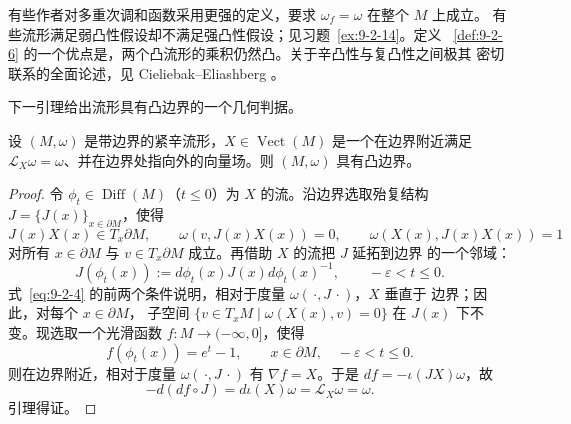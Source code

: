 \begin{remark}\label{rem:9-2-7}
有些作者对多重次调和函数采用更强的定义，要求 $\omega_f=\omega$ 在整个 $M$ 上成立。
有些流形满足弱凸性假设却不满足强凸性假设；见习题~\ref{ex:9-2-14}。定义
~\ref{def:9-2-6} 的一个优点是，两个凸流形的乘积仍然凸。关于辛凸性与复凸性之间极其
密切联系的全面论述，见 Cieliebak--Eliashberg 。
\end{remark}

下一引理给出流形具有凸边界的一个几何判据。

\begin{lemma}\label{lem:9-2-8}
设 $(M,\omega)$ 是带边界的紧辛流形，$X\in\operatorname{Vect}(M)$ 是一个在边界附近满足
$\mathcal L_X\omega=\omega$、并在边界处指向外的向量场。则 $(M,\omega)$ 具有凸边界。
\end{lemma}

\begin{proof}
令 $\phi_t\in\operatorname{Diff}(M)$（$t\le0$）为 $X$ 的流。沿边界选取殆复结构
$J=\{J(x)\}_{x\in\partial M}$，使得
\begin{equation}\label{eq:9-2-4}
  J(x)X(x)\in T_x\partial M,
  \qquad \omega(v,J(x)X(x))=0,
  \qquad \omega(X(x),J(x)X(x))=1
\end{equation}
对所有 $x\in\partial M$ 与 $v\in T_x\partial M$ 成立。再借助 $X$ 的流把 $J$ 延拓到边界
的一个邻域：
\[
  J(\phi_t(x)):=d\phi_t(x)J(x)d\phi_t(x)^{-1},
  \qquad -\varepsilon<t\le0.
\]
式~\eqref{eq:9-2-4} 的前两个条件说明，相对于度量 $\omega(\,·,J\,·)$，$X$ 垂直于
边界；因此，对每个 $x\in\partial M$，
子空间
$\{v\in T_xM\mid\omega(X(x),v)=0\}$ 在 $J(x)$ 下不变。现选取一个光滑函数
$f:M\to(-\infty,0]$，使得
\[
  f(\phi_t(x))=e^t-1,
  \qquad x\in\partial M,\quad -\varepsilon<t\le0.
\]
\sourcefootnote{原书此处印作 $f(\phi_t(x))=e^t$，但同时规定
$f:M\to(-\infty,0]$ 且 $\partial M=f^{-1}(0)$；在 $t=0$ 时原式给出 $f=1$。唯一\BookRecordIndex{T0348}相容的
归一化是 $e^t-1$。}
则在边界附近，相对于度量 $\omega(\,·,J\,·)$ 有 $\nabla f=X$。于是
$df=-\iota(JX)\omega$，故
\[
  -d(df\circ J)=d\iota(X)\omega=\mathcal L_X\omega=\omega.
\]
引理得证。
\end{proof}

